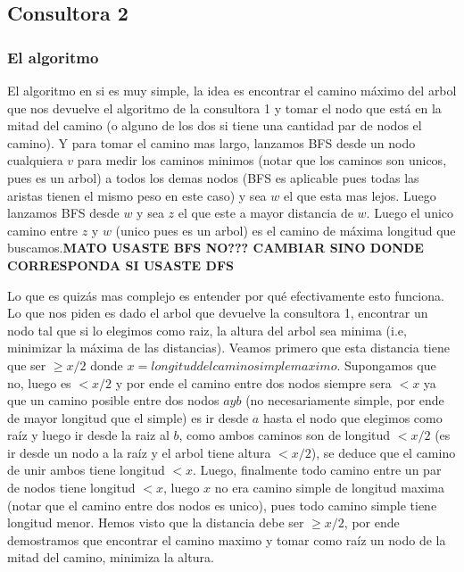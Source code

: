 \documentclass[A4paper,oneside,fleqn,11pt]{article}
\theoremstyle{definition}
\begin{document}
\subsection{Consultora 2}


\subsubsection{El algoritmo}
El algoritmo en si es muy simple, la idea es encontrar el camino máximo del arbol que nos devuelve el algoritmo de la consultora 1 y tomar el nodo que está en la mitad del camino (o alguno de los dos si tiene una cantidad par de nodos el camino). Y para tomar el camino mas largo, lanzamos BFS desde un nodo cualquiera $v$ para medir los caminos minimos (notar que los caminos son unicos, pues es un arbol) a todos los demas nodos (BFS es aplicable pues todas las aristas tienen el mismo peso en este caso) y sea $w$ el que esta mas lejos. Luego lanzamos BFS desde $w$ y sea $z$ el que este a mayor distancia de $w$. Luego el unico camino entre $z$ y $w$ (unico pues es un arbol) es el camino de máxima longitud que buscamos.\textbf{MATO USASTE BFS NO??? CAMBIAR SINO DONDE CORRESPONDA SI USASTE DFS}

Lo que es quizás mas complejo es entender por qué efectivamente esto funciona. Lo que nos piden es dado el arbol que devuelve la consultora 1, encontrar un nodo tal que si lo elegimos como raiz, la altura del arbol sea minima (i.e, minimizar la máxima de las distancias). Veamos primero que esta distancia tiene que ser $\geq x/2$ donde $x = longitud del camino simple maximo$. Supongamos que no, luego es $<x/2$ y por ende el camino entre dos nodos siempre sera $<x$ ya que un camino posible entre dos nodos $a y b$ (no necesariamente simple, por ende de mayor longitud que el simple) es ir desde $a$ hasta el nodo que elegimos como raíz y luego ir desde la raiz al $b$, como ambos caminos son de longitud $<x/2$ (es ir desde un nodo a la raíz y el arbol tiene altura $<x/2$), se deduce que el camino de unir ambos tiene longitud $<x$. Luego, finalmente todo camino entre un par de nodos tiene longitud $<x$, luego $x$ no era camino simple de longitud maxima (notar que el camino entre dos nodos es unico), pues todo camino simple tiene longitud menor. Hemos visto que la distancia debe ser $\geq x/2$, por ende demostramos que encontrar el camino maximo y tomar como raíz un nodo de la mitad del camino, minimiza la altura.
\end{document}
